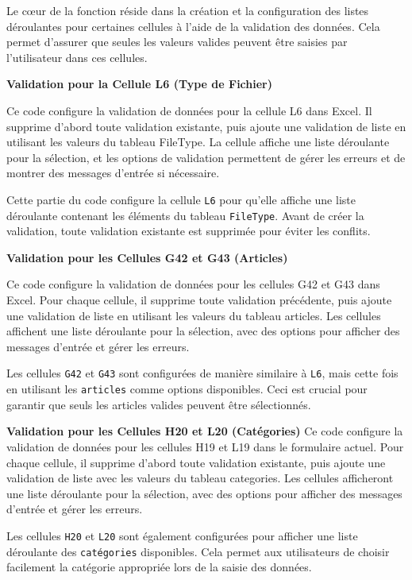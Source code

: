 \documentclass[a4paper, oneside, 12pt, final]{extreport}
\begin{document}
Le cœur de la fonction réside dans la création et la configuration des listes déroulantes pour certaines cellules à l'aide de la validation des données. Cela permet d'assurer que seules les valeurs valides peuvent être saisies par l'utilisateur dans ces cellules.

\textbf{Validation pour la Cellule L6 (Type de Fichier)}

Ce code configure la validation de données pour la cellule L6 dans Excel. Il supprime d'abord toute validation existante, puis ajoute une validation de liste en utilisant les valeurs du tableau FileType. La cellule affiche une liste déroulante pour la sélection, et les options de validation permettent de gérer les erreurs et de montrer des messages d'entrée si nécessaire.

Cette partie du code configure la cellule \texttt{L6} pour qu'elle affiche une liste déroulante contenant les éléments du tableau \texttt{FileType}. Avant de créer la validation, toute validation existante est supprimée pour éviter les conflits.

\textbf{Validation pour les Cellules G42 et G43 (Articles)}

Ce code configure la validation de données pour les cellules G42 et G43 dans Excel. Pour chaque cellule, il supprime toute validation précédente, puis ajoute une validation de liste en utilisant les valeurs du tableau articles. Les cellules affichent une liste déroulante pour la sélection, avec des options pour afficher des messages d'entrée et gérer les erreurs.

Les cellules \texttt{G42} et \texttt{G43} sont configurées de manière similaire à \texttt{L6}, mais cette fois en utilisant les \texttt{articles} comme options disponibles. Ceci est crucial pour garantir que seuls les articles valides peuvent être sélectionnés.

\textbf{Validation pour les Cellules H20 et L20 (Catégories)}
Ce code configure la validation de données pour les cellules H19 et L19 dans le formulaire actuel. Pour chaque cellule, il supprime d'abord toute validation existante, puis ajoute une validation de liste avec les valeurs du tableau categories. Les cellules afficheront une liste déroulante pour la sélection, avec des options pour afficher des messages d'entrée et gérer les erreurs.








Les cellules \texttt{H20} et \texttt{L20} sont également configurées pour afficher une liste déroulante des \texttt{catégories} disponibles. Cela permet aux utilisateurs de choisir facilement la catégorie appropriée lors de la saisie des données.
\end{document}
